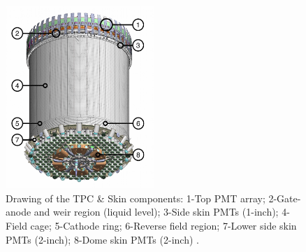 \begin{figure}[!ht]
     \centering
     \includegraphics[width=0.5\textwidth]{figures/LZ/CAD_TPC.jpg}
     \caption{Drawing of the TPC \& Skin components: 1-Top PMT array; 2-Gate-anode and weir region (liquid level); 3-Side skin PMTs (1-inch); 4-Field cage; 5-Cathode ring; 6-Reverse field region; 7-Lower side skin PMTs (2-inch); 8-Dome skin PMTs (2-inch) \cite{LZNIMA}.}
     \label{fig:LZ/CAD_TPC}
\end{figure}

